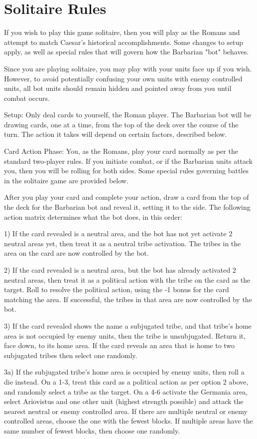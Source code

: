 \section{Solitaire Rules}

If you wish to play this game solitaire, then you will play as the Romans and attempt to match Caesar's historical accomplishments. Some changes to setup apply, as well as special rules that will govern how the Barbarian "bot" behaves.

Since you are playing solitaire, you may play with your units face up if you wish. However, to avoid potentially confusing your own units with enemy controlled units, all bot units should remain hidden and pointed away from you until combat occurs.

Setup: Only deal cards to yourself, the Roman player. The Barbarian bot will be drawing cards, one at a time, from the top of the deck over the course of the turn. The action it takes will depend on certain factors, described below.

Card Action Phase: You, as the Romans, play your card normally as per the standard two-player rules. If you initiate combat, or if the Barbarian units attack you, then you will be rolling for both sides. Some special rules governing battles in the solitaire game are provided below.

After you play your card and complete your action, draw a card from the top of the deck for the Barbarian bot and reveal it, setting it to the side. The following action matrix determines what the bot does, in this order:

1) If the card revealed is a neutral area, and the bot has not yet activate 2 neutral areas yet, then treat it as a neutral tribe activation. The tribes in the area on the card are now controlled by the bot.

2) If the card revealed is a neutral area, but the bot has already activated 2 neutral areas, then treat it as a political action with the tribe on the card as the target. Roll to resolve the political action, using the -1 bonus for the card matching the area. If successful, the tribes in that area are now controlled by the bot.

3) If the card revealed shows the name a subjugated tribe, and that tribe's home area is not occupied by enemy units, then the tribe is unsubjugated. Return it, face down, to its home area. If the card reveals an area that is home to two subjugated tribes then select one randomly.

3a) If the subjugated tribe's home area is occupied by enemy units, then roll a die instead. On a 1-3, treat this card as a political action as per option 2 above, and randomly select a tribe as the target. On a 4-6 activate the Germania area, select Ariovistus and one other unit (highest strength possible) and attack the nearest neutral or enemy controlled area. If there are multiple neutral or enemy controlled areas, choose the one with the fewest blocks. If multiple areas have the same number of fewest blocks, then choose one randomly.

